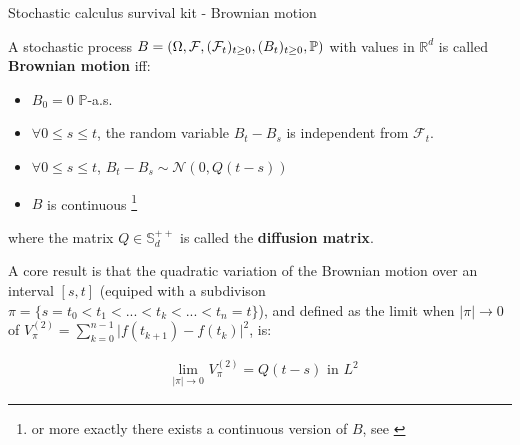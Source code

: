 \begin{frame}{Stochastic calculus survival kit - Brownian motion}
\begin{definition}
A stochastic process $B = (\Omega, \mathcal{F}, (\mathcal{F}_t)_{t \geq 0}, (B_t)_{t \geq 0}, \mathbb{P})$ with values in $\mathbb{R}^d$ is called \textbf{Brownian motion} iff:
\begin{itemize}
    \item $B_0 = 0$ $\mathbb{P}$-a.s.
    \item $\forall 0 \leq s \leq t$, the random variable $B_t-B_s$ is independent from $\mathcal{F}_t$.
    \item $\forall 0 \leq s \leq t$, $B_t - B_s \sim \mathcal{N}(0,Q(t-s))$
    \item $B$ is continuous \footnote{or more exactly there exists a continuous version of $B$, see \cite{mouvement-brownien-calcul-ito}}
\end{itemize}
where the matrix $Q \in \mathbb{S}^{++}_d$ is called the \textbf{diffusion matrix}.
\end{definition}


A core result is that the quadratic variation of the Brownian motion over an interval $[s,t]$ (equiped
with a subdivison $\pi = \{s=t_0 < t_1 < ...< t_k <... < t_n=t\}$), and defined as the limit when $\vert \pi \vert \rightarrow 0$ 
of $V_{\pi}^{(2)} = \sum_{k=0}^{n-1} \vert f(t_{k+1})-f(t_k)\vert^{2}$, is:

\begin{align}
    &\underset{\vert \pi \vert \rightarrow 0}{\text{lim}}\,\, V_{\pi}^{(2)} = Q(t-s) \,\, \text{in} \,\, L^{2}
\end{align}

\end{frame}



